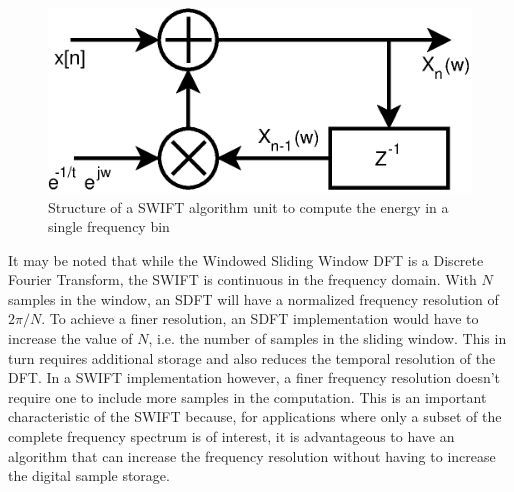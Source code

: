 \begin{figure}
\centering
\includegraphics[width=0.75\columnwidth]{Figures/fig_SWIFT_algorithm.eps}
\caption{Structure of a SWIFT algorithm unit to compute the energy in a single frequency bin}
\label{fig:SWIFT_structure}
\end{figure}

It may be noted that while the Windowed Sliding Window DFT is a Discrete Fourier Transform, the SWIFT is continuous in the frequency domain. With $N$ samples in the window, an SDFT will have a normalized frequency resolution of $2\pi/N$. To achieve a finer resolution, an SDFT implementation would have to increase the value of $N$, i.e. the number of samples in the sliding window. This in turn requires additional storage and also reduces the temporal resolution of the DFT. 
In a SWIFT implementation however, a finer frequency resolution doesn't require one to include more samples in the computation. This is an important characteristic of the SWIFT because, for applications where only a subset of the complete frequency spectrum is of interest, it is advantageous to have an algorithm that can increase the frequency resolution without having to increase the digital sample storage. 